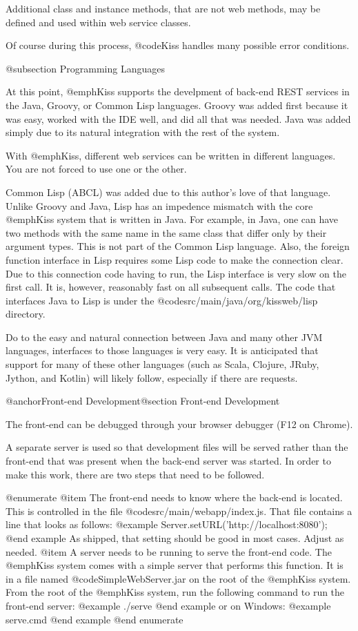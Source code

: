 Additional class and instance methods, that are not web methods, may
be defined and used within web service classes.

Of course during this process, @code{Kiss} handles many possible error conditions.

@subsection Programming Languages

At this point, @emph{Kiss} supports the develpment of back-end REST
services in the Java, Groovy, or Common Lisp languages.  Groovy was
added first because it was easy, worked with the IDE well, and did all
that was needed.  Java was added simply due to its natural integration
with the rest of the system.

With @emph{Kiss}, different web services can be written in different
languages.  You are not forced to use one or the other.

Common Lisp (ABCL) was added due to this author's love of that
language.  Unlike Groovy and Java, Lisp has an impedence mismatch with
the core @emph{Kiss} system that is written in Java.  For example, in
Java, one can have two methods with the same name in the same class
that differ only by their argument types.  This is not part of the
Common Lisp language.  Also, the foreign function interface in Lisp
requires some Lisp code to make the connection clear.  Due to this
connection code having to run, the Lisp interface is very slow on the
first call.  It is, however, reasonably fast on all subsequent calls.
The code that interfaces Java to Lisp is under the
@code{src/main/java/org/kissweb/lisp} directory.

Do to the easy and natural connection between Java and many other JVM
languages, interfaces to those languages is very easy.  It is
anticipated that support for many of these other languages (such as
Scala, Clojure, JRuby, Jython, and Kotlin) will likely follow,
especially if there are requests.

@anchor{Front-end Development}@section Front-end Development

The front-end can be debugged through your browser debugger (F12 on Chrome).

A separate server is used so that development files will be served
rather than the front-end that was present when the back-end server
was started.  In order to make this work, there are two steps that
need to be followed.

@enumerate
@item
The front-end needs to know where the back-end is located.  This is controlled in the file @code{src/main/webapp/index.js}.
That file contains a line that looks as follows:
@example
    Server.setURL('http://localhost:8080');
@end example
As shipped, that setting should be good in most cases.  Adjust as needed.
@item
A server needs to be running to serve the front-end code.  The
@emph{Kiss} system comes with a simple server that performs this
function.  It is in a file named @code{SimpleWebServer.jar} on the
root of the @emph{Kiss} system.  From the root of the @emph{Kiss}
system, run the following command to run the front-end server:
@example
   ./serve
@end example
or on Windows:
@example
   serve.cmd
@end example
@end enumerate

